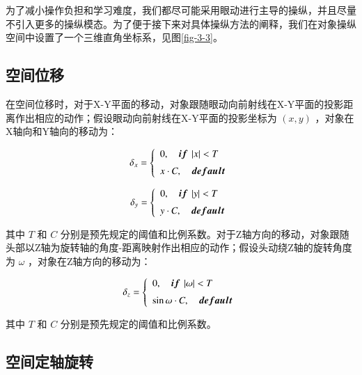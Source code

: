 为了减小操作负担和学习难度，我们都尽可能采用眼动进行主导的操纵，并且尽量不引入更多的操纵模态。为了便于接下来对具体操纵方法的阐释，我们在对象操纵空间中设置了一个三维直角坐标系，见图\ref{fig-3-3}。

\subsection{空间位移}

在空间位移时，对于X-Y平面的移动，对象跟随眼动向前射线在X-Y平面的投影距离作出相应的动作；假设眼动向前射线在X-Y平面的投影坐标为 $(x, y)$ ，对象在X轴向和Y轴向的移动为：

\begin{equation}
	\label{formula-3-2}
	\delta_x = 
    \left\{
    \begin{array}{l}
        0, \quad {\mbox{\boldmath $if$}}\ \left|x\right| < T \\ [0.2cm]
        x \cdot C,\quad {\mbox{\boldmath $default$}}
    \end{array}
    \right.
\end{equation}

\begin{equation}
	\label{formula-3-3}
	\delta_y = 
    \left\{
    \begin{array}{l}
        0, \quad {\mbox{\boldmath $if$}}\ \left|y\right| < T \\ [0.2cm]
        y \cdot C,\quad {\mbox{\boldmath $default$}}
    \end{array}
    \right.
\end{equation}

其中 $T$ 和 $C$ 分别是预先规定的阈值和比例系数。对于Z轴方向的移动，对象跟随头部以Z轴为旋转轴的角度-距离映射作出相应的动作；假设头动绕Z轴的旋转角度为 $\omega$ ，对象在Z轴方向的移动为：

\begin{equation}
	\label{formula-3-4}
	\delta_z = 
    \left\{
    \begin{array}{l}
        0, \quad {\mbox{\boldmath $if$}}\ \left|\omega\right| < T \\ [0.2cm]
        \sin{\omega} \cdot C,\quad {\mbox{\boldmath $default$}}
    \end{array}
    \right.
\end{equation}

其中 $T$ 和 $C$ 分别是预先规定的阈值和比例系数。

\subsection{空间定轴旋转}

